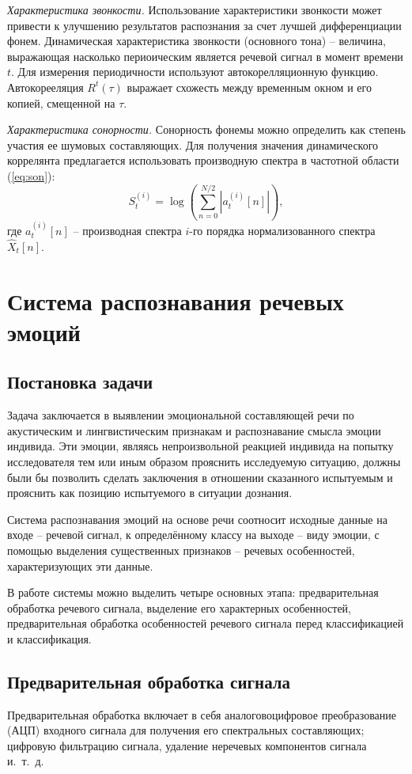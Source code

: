 \textit{Характеристика звонкости.} Использование характеристики звонкости может привести к улучшению результатов распознания за счет лучшей дифференциации фонем. Динамическая характеристика звонкости (основного тона) -- величина, выражающая насколько периоическим является речевой сигнал в момент времени $t$. Для измерения периодичности используют автокорелляционную функцию. Автокорееляция $R^t(\tau)$ выражает схожесть между временным окном и его копией, смещенной на $\tau$.

\textit{Характеристика сонорности.} Сонорность фонемы можно определить как степень участия ее шумовых составляющих. Для получения значения динамического коррелянта предлагается \cite{sonor} использовать производную спектра в частотной области (\ref{eq:son}):
\begin{equation}\label{eq:son}
    S^{(i)}_t = \log\left( \sum^{N / 2}_{n = 0}\left|a^{(i)}_t[n]\right|\right),
\end{equation}
где $a^{(i)}_t[n]$ -- производная спектра $i$-го порядка нормализованного спектра $\hat{X}_t[n]$. 
\chapter{Система распознавания речевых эмоций}
\section{Постановка задачи}
Задача заключается в выявлении эмоциональной составляющей речи по акустическим и лингвистическим признакам и распознавание смысла эмоции индивида. Эти эмоции, являясь непроизвольной реакцией индивида на попытку исследователя тем или иным образом прояснить исследуемую ситуацию, должны были бы позволить сделать заключения в отношении сказанного испытуемым и прояснить как позицию испытуемого в ситуации
дознания.

Система распознавания эмоций на основе речи соотносит исходные данные на входе -- речевой сигнал, к определённому классу на выходе -- виду эмоции, с помощью выделения существенных признаков -- речевых особенностей, характеризующих эти данные.

В работе системы можно выделить четыре основных этапа: предварительная обработка речевого сигнала, выделение его характерных особенностей, предварительная обработка особенностей речевого сигнала перед классификацией и классификация.

\section{Предварительная обработка сигнала}
Предварительная обработка включает в себя аналоговоцифровое преобразование (АЦП) входного сигнала для получения его спектральных составляющих; цифровую фильтрацию сигнала, удаление неречевых компонентов сигнала и.~т.~д. \cite{preprocess}


